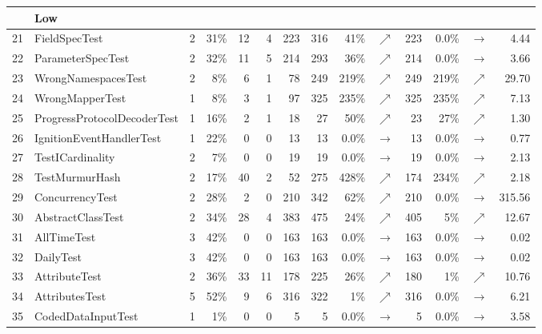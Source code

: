 \begin{table}
\begin{tabular}{|llrrrr|rrrr|rrr|r|}
		\hline
		&\multicolumn{3}{l}{Low \ms}\\
		\hline
		21&\scriptsize{FieldSpecTest}&2&31\%&12&4&223&316&41\%&{\color{ForestGreen}$\nearrow$}&223&0.0\%&$\rightarrow$&4.44 \\
		\rowcolor[HTML]{EFEFEF}
		22&\scriptsize{ParameterSpecTest}&2&32\%&11&5&214&293&36\%&{\color{ForestGreen}$\nearrow$}&214&0.0\%&$\rightarrow$&3.66 \\
		23&\scriptsize{WrongNamespacesTest}&2&8\%&6&1&78&249&219\%&{\color{ForestGreen}$\nearrow$}&249&219\%&{\color{ForestGreen}$\nearrow$}&29.70 \\
		\rowcolor[HTML]{EFEFEF}
		24&\scriptsize{WrongMapperTest}&1&8\%&3&1&97&325&235\%&{\color{ForestGreen}$\nearrow$}&325&235\%&{\color{ForestGreen}$\nearrow$}&7.13 \\
		25&\scriptsize{ProgressProtocolDecoderTest}&1&16\%&2&1&18&27&50\%&{\color{ForestGreen}$\nearrow$}&23&27\%&{\color{ForestGreen}$\nearrow$}&1.30 \\
		\rowcolor[HTML]{EFEFEF}
		26&\scriptsize{IgnitionEventHandlerTest}&1&22\%&0&0&13&13&0.0\%&$\rightarrow$&13&0.0\%&$\rightarrow$&0.77 \\
		27&\scriptsize{TestICardinality}&2&7\%&0&0&19&19&0.0\%&$\rightarrow$&19&0.0\%&$\rightarrow$&2.13 \\
		\rowcolor[HTML]{EFEFEF}
		28&\scriptsize{TestMurmurHash}&2&17\%&40&2&52&275&428\%&{\color{ForestGreen}$\nearrow$}&174&234\%&{\color{ForestGreen}$\nearrow$}&2.18 \\
		29&\scriptsize{ConcurrencyTest}&2&28\%&2&0&210&342&62\%&{\color{ForestGreen}$\nearrow$}&210&0.0\%&$\rightarrow$&315.56 \\
		\rowcolor[HTML]{EFEFEF}
		30&\scriptsize{AbstractClassTest}&2&34\%&28&4&383&475&24\%&{\color{ForestGreen}$\nearrow$}&405&5\%&{\color{ForestGreen}$\nearrow$}&12.67 \\
		31&\scriptsize{AllTimeTest}&3&42\%&0&0&163&163&0.0\%&$\rightarrow$&163&0.0\%&$\rightarrow$&0.02 \\
		\rowcolor[HTML]{EFEFEF}
		32&\scriptsize{DailyTest}&3&42\%&0&0&163&163&0.0\%&$\rightarrow$&163&0.0\%&$\rightarrow$&0.02 \\
		33&\scriptsize{AttributeTest}&2&36\%&33&11&178&225&26\%&{\color{ForestGreen}$\nearrow$}&180&1\%&{\color{ForestGreen}$\nearrow$}&10.76 \\
		\rowcolor[HTML]{EFEFEF}
		34&\scriptsize{AttributesTest}&5&52\%&9&6&316&322&1\%&{\color{ForestGreen}$\nearrow$}&316&0.0\%&$\rightarrow$&6.21 \\
		35&\scriptsize{CodedDataInputTest}&1&1\%&0&0&5&5&0.0\%&$\rightarrow$&5&0.0\%&$\rightarrow$&3.58 \\

\end{tabular}
\end{table}
